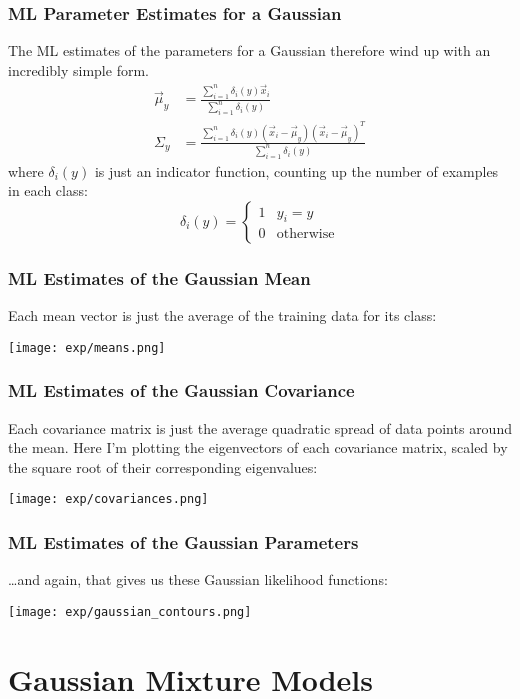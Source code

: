 \documentclass{beamer}
\begin{document}
\begin{frame}
  \frametitle{ML Parameter Estimates for a Gaussian}

  The ML estimates of the parameters for a Gaussian therefore wind up
  with an incredibly simple form.
  \begin{align*}
    \vec\mu_y &= \frac{\sum_{i=1}^n \delta_i(y) \vec{x}_i}{\sum_{i=1}^n\delta_i(y)}\\
    \Sigma_y &= \frac{\sum_{i=1}^n \delta_i(y) (\vec{x}_i-\vec\mu_y)(\vec{x}_i-\vec\mu_y)^T}{\sum_{i=1}^n\delta_i(y)}
  \end{align*}
  where $\delta_i(y)$ is just an indicator function, counting up the
  number of examples in each class:
  \begin{displaymath}
    \delta_i(y)=\begin{cases}
    1 & y_i=y\\
    0 & \mbox{otherwise}
    \end{cases}
  \end{displaymath}
\end{frame}

\begin{frame}
  \frametitle{ML Estimates of the Gaussian Mean}

  Each mean vector is just the average of the training data for its class:
  \centerline{\texttt{[image: exp/means.png]}}
\end{frame}

\begin{frame}
  \frametitle{ML Estimates of the Gaussian Covariance}

  Each covariance matrix is just the average quadratic spread of data
  points around the mean.  Here I'm plotting the eigenvectors of each
  covariance matrix, scaled by the square root of their corresponding
  eigenvalues:
  
  \centerline{\texttt{[image: exp/covariances.png]}}
\end{frame}

\begin{frame}
  \frametitle{ML Estimates of the Gaussian Parameters}

  \ldots and again, that gives us these Gaussian  likelihood functions:
  
  \centerline{\texttt{[image: exp/gaussian\_contours.png]}}
\end{frame}

\section[GMM]{Gaussian Mixture Models}
\setcounter{subsection}{1}
\end{document}
